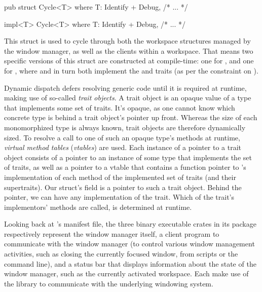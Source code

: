 \begin{rustblock}
  pub struct Cycle<T>
  where
    T: Identify + Debug,
  { /* ... */ }
\end{rustblock}
\begin{rustblock}
  impl<T> Cycle<T>
  where
      T: Identify + Debug,
  { /* ... */ }
\end{rustblock}

This struct is used to cycle through both the workspace structures managed
by the window manager, as well as the clients within a workspace. That
means two specific versions of this struct are constructed at compile-time:
one for , and one for , where
 and  in turn both implement the 
and  traits (as per the constraint on ).


Dynamic dispatch defers resolving generic code until it is required at
runtime, making use of so-called \textit{trait objects}\cite{therustbook,
rustdynamicdispatch}. A trait object is an opaque value of a type that
implements some set of traits\cite{therustreference}. It's opaque,
as one cannot know which concrete type is behind a trait object's
pointer up front\cite{therustreference}. Whereas the size of each
monomorphized type is always known, trait objects are therefore dynamically
sized\cite{therustreference}. To resolve a call to one of such an opaque
type's methods at runtime, \textit{virtual method tables} (\textit{vtables})
are used\cite{therustreference}. Each instance of a pointer to a trait object
consists of a pointer to an instance of some type  that implements
the set of traits, as well as a pointer to a vtable that contains a function
pointer to 's implementation of each method of the implemented set of
traits (and their supertraits)\cite{therustreference}. Our  struct's
 field is a pointer to such a trait object. Behind the pointer, we
can have any implementation of the  trait. Which of the trait's
implementors' methods are called, is determined at runtime.

Looking back at \wmrs's manifest file, the three binary executable crates in
its package respectively represent the window manager itself, a client program
to communicate with the window manager (to control various window management
activities, such as closing the currently focused window, from scripts or the
command line), and a status bar that displays information about the state of the
window manager, such as the currently activated workspace. Each make use of the
 library to communicate with the underlying windowing system.

